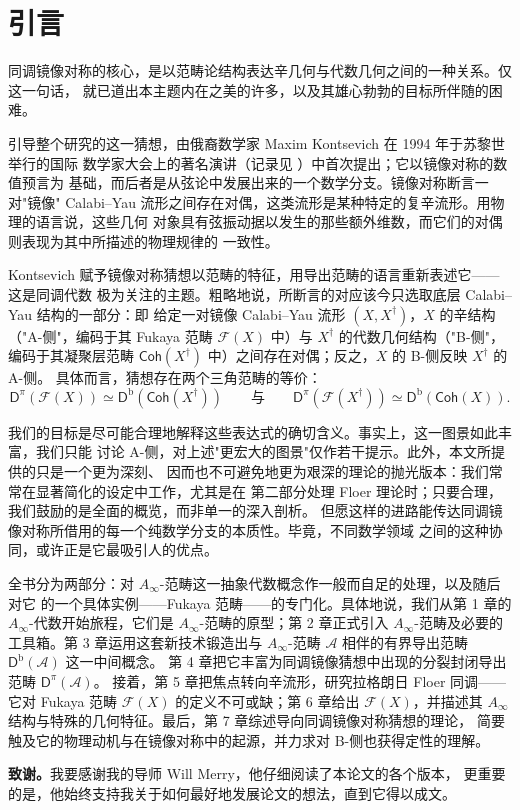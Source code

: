\section*{引言}

同调镜像对称的核心，是以范畴论结构表达辛几何与代数几何之间的一种关系。仅这一句话，
就已道出本主题内在之美的许多，以及其雄心勃勃的目标所伴随的困难。

引导整个研究的这一猜想，由俄裔数学家 Maxim Kontsevich 在 1994 年于苏黎世举行的国际
数学家大会上的著名演讲（记录见 \cite{Kon94}）中首次提出；它以镜像对称的数值预言为
基础，而后者是从弦论中发展出来的一个数学分支。镜像对称断言一对"镜像"
Calabi--Yau 流形之间存在对偶，这类流形是某种特定的复辛流形。用物理的语言说，这些几何
对象具有弦振动据以发生的那些额外维数，而它们的对偶则表现为其中所描述的物理规律的
一致性。

Kontsevich 赋予镜像对称猜想以范畴的特征，用导出范畴的语言重新表述它——这是同调代数
极为关注的主题。粗略地说，所断言的对应该今只选取底层 Calabi--Yau 结构的一部分：即
给定一对镜像 Calabi--Yau 流形 $(X,X^\dagger)$，$X$ 的辛结构（"A-侧"，编码于其 Fukaya
范畴 $\mathcal F(X)$ 中）与 $X^\dagger$ 的代数几何结构（"B-侧"，编码于其凝聚层范畴
$\mathsf{Coh}(X^\dagger)$ 中）之间存在对偶；反之，$X$ 的 B-侧反映 $X^\dagger$ 的 A-侧。
具体而言，猜想存在两个三角范畴的等价：
\begin{equation*}
  \mathsf D^\pi(\mathcal F(X))\simeq \mathsf D^{\mathrm b}(\mathsf{Coh}(X^\dagger))
  \qquad\text{与}\qquad
  \mathsf D^\pi(\mathcal F(X^\dagger))\simeq \mathsf D^{\mathrm b}(\mathsf{Coh}(X)) .
\end{equation*}

我们的目标是尽可能合理地解释这些表达式的确切含义。事实上，这一图景如此丰富，我们只能
讨论 A-侧，对上述"更宏大的图景"仅作若干提示。此外，本文所提供的只是一个更为深刻、
因而也不可避免地更为艰深的理论的抛光版本：我们常常在显著简化的设定中工作，尤其是在
第二部分处理 Floer 理论时；只要合理，我们鼓励的是全面的概览，而非单一的深入剖析。
但愿这样的进路能传达同调镜像对称所借用的每一个纯数学分支的本质性。毕竟，不同数学领域
之间的这种协同，或许正是它最吸引人的优点。

全书分为两部分：对 $A_\infty$-范畴这一抽象代数概念作一般而自足的处理，以及随后对它
的一个具体实例——Fukaya 范畴——的专门化。具体地说，我们从第 1 章的
$A_\infty$-代数开始旅程，它们是 $A_\infty$-范畴的原型；第 2 章正式引入
$A_\infty$-范畴及必要的工具箱。第 3 章运用这套新技术锻造出与 $A_\infty$-范畴
$\mathcal A$ 相伴的有界导出范畴 $\mathsf D^{\mathrm b}(\mathcal A)$ 这一中间概念。
第 4 章把它丰富为同调镜像猜想中出现的分裂封闭导出范畴 $\mathsf D^\pi(\mathcal A)$。
接着，第 5 章把焦点转向辛流形，研究拉格朗日 Floer 同调——它对 Fukaya 范畴
$\mathcal F(X)$ 的定义不可或缺；第 6 章给出 $\mathcal F(X)$，并描述其
$A_\infty$ 结构与特殊的几何特征。最后，第 7 章综述导向同调镜像对称猜想的理论，
简要触及它的物理动机与在镜像对称中的起源，并力求对 B-侧也获得定性的理解。

\vspace{0.6em}
\noindent\textbf{致谢。}我要感谢我的导师 Will Merry，他仔细阅读了本论文的各个版本，
更重要的是，他始终支持我关于如何最好地发展论文的想法，直到它得以成文。
